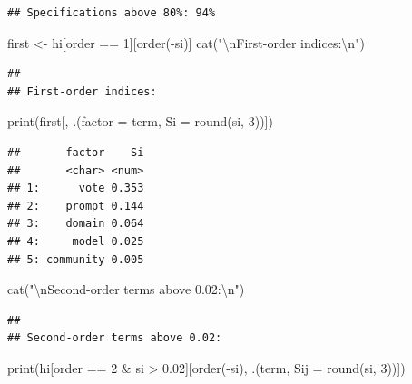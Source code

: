 \documentclass[
  11pt,
]{article}
\newenvironment{Shaded}{\begin{snugshade}}{\end{snugshade}}
\newcommand{\AttributeTok}[1]{\textcolor[rgb]{0.77,0.63,0.00}{#1}}
\newcommand{\DecValTok}[1]{\textcolor[rgb]{0.00,0.00,0.81}{#1}}
\newcommand{\FloatTok}[1]{\textcolor[rgb]{0.00,0.00,0.81}{#1}}
\newcommand{\FunctionTok}[1]{\textcolor[rgb]{0.00,0.00,0.00}{#1}}
\newcommand{\NormalTok}[1]{#1}
\newcommand{\OtherTok}[1]{\textcolor[rgb]{0.56,0.35,0.01}{#1}}
\newcommand{\SpecialCharTok}[1]{\textcolor[rgb]{0.00,0.00,0.00}{#1}}
\newcommand{\StringTok}[1]{\textcolor[rgb]{0.31,0.60,0.02}{#1}}
\begin{document}
\begin{verbatim}
## Specifications above 80%: 94%
\end{verbatim}

\begin{Shaded}
\begin{Highlighting}[]
\NormalTok{first }\OtherTok{\textless{}{-}}\NormalTok{ hi[order }\SpecialCharTok{==} \DecValTok{1}\NormalTok{][}\FunctionTok{order}\NormalTok{(}\SpecialCharTok{{-}}\NormalTok{si)]}
\FunctionTok{cat}\NormalTok{(}\StringTok{"}\SpecialCharTok{\textbackslash{}n}\StringTok{First{-}order indices:}\SpecialCharTok{\textbackslash{}n}\StringTok{"}\NormalTok{)}
\end{Highlighting}
\end{Shaded}

\begin{verbatim}
## 
## First-order indices:
\end{verbatim}

\begin{Shaded}
\begin{Highlighting}[]
\FunctionTok{print}\NormalTok{(first[, .(}\AttributeTok{factor =}\NormalTok{ term, }\AttributeTok{Si =} \FunctionTok{round}\NormalTok{(si, }\DecValTok{3}\NormalTok{))])}
\end{Highlighting}
\end{Shaded}

\begin{verbatim}
##       factor    Si
##       <char> <num>
## 1:      vote 0.353
## 2:    prompt 0.144
## 3:    domain 0.064
## 4:     model 0.025
## 5: community 0.005
\end{verbatim}

\begin{Shaded}
\begin{Highlighting}[]
\FunctionTok{cat}\NormalTok{(}\StringTok{"}\SpecialCharTok{\textbackslash{}n}\StringTok{Second{-}order terms above 0.02:}\SpecialCharTok{\textbackslash{}n}\StringTok{"}\NormalTok{)}
\end{Highlighting}
\end{Shaded}

\begin{verbatim}
## 
## Second-order terms above 0.02:
\end{verbatim}

\begin{Shaded}
\begin{Highlighting}[]
\FunctionTok{print}\NormalTok{(hi[order }\SpecialCharTok{==} \DecValTok{2} \SpecialCharTok{\&}\NormalTok{ si }\SpecialCharTok{\textgreater{}} \FloatTok{0.02}\NormalTok{][}\FunctionTok{order}\NormalTok{(}\SpecialCharTok{{-}}\NormalTok{si), .(term, }\AttributeTok{Sij =} \FunctionTok{round}\NormalTok{(si, }\DecValTok{3}\NormalTok{))])}
\end{Highlighting}
\end{Shaded}
\end{document}

